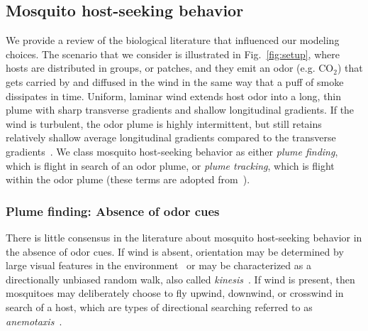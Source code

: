 \documentclass[10pt]{article}
\begin{document}
\subsection*{Mosquito host-seeking behavior}\label{sec:mosqbehav}

We provide a review of the biological literature that influenced our modeling choices. The scenario that we consider is illustrated in Fig.~\ref{fig:setup}, where hosts are distributed in groups, or patches, and they emit an odor (e.g. $\mbox{CO}_2$) that gets carried by and diffused in the wind in the same way that a puff of smoke dissipates in time. Uniform, laminar wind extends host odor into a long, thin plume with sharp transverse gradients and shallow longitudinal gradients. If the wind is turbulent, the odor plume is highly intermittent, but still retains relatively shallow average longitudinal gradients compared to the transverse
gradients~\cite{Vickers2000}.
We class mosquito host-seeking behavior as either
\textit{plume finding}, which is flight in search of an odor plume, or \textit{plume tracking}, which is flight within the odor plume (these terms are adopted from~\cite{Pasternak2009}).


\subsubsection*{Plume finding: Absence of odor cues}
There is little consensus in the literature about mosquito host-seeking behavior in the absence of odor cues. If wind is absent, orientation may be determined by large visual features in the
environment~\cite{Bidlingmayer1994} or may be characterized as a directionally unbiased random walk, also called \textit{kinesis}~\cite{OkumuModel2010}. If wind is present, then mosquitoes may deliberately choose to fly upwind, downwind, or crosswind in search of a host, which are types of directional searching referred to as \textit{anemotaxis}~\cite{Clements1999}.  
\end{document}
